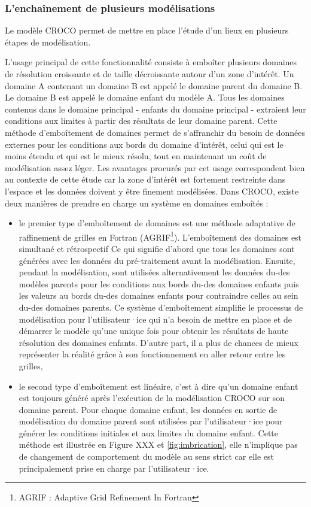 \documentclass[10pt,a4paper,titlepage]{article}
\begin{document}
\subsubsection{L'enchaînement de plusieurs modélisations}
\label{subsub:enchainement_modelisations}
Le modèle CROCO permet de mettre en place l'étude d'un lieux en plusieurs étapes de modélisation.

L'usage principal de cette fonctionnalité consiste à emboîter plusieurs domaines de résolution croissante et de taille décroissante autour d'un zone d'intérêt.
Un domaine A contenant un domaine B est appelé le domaine parent du domaine B.
Le domaine B est appelé le domaine enfant du modèle A.
Tous les domaines contenus dans le domaine principal - enfants du domaine principal - extraient leur conditions aux limites à partir des résultats de leur domaine parent.
Cette méthode d'emboîtement de domaines permet de s'affranchir du besoin de données externes pour les conditions aux bords du domaine d'intérêt, celui qui est le moins étendu et qui est le mieux résolu, tout en maintenant un coût de modélisation assez léger.
Les avantages procurés par cet usage correspondent bien au contexte de cette étude car la zone d'intérêt est fortement restreinte dans l'espace et les données doivent y être finement modélisées.
Dans CROCO, existe deux manières de prendre en charge un système en domaines emboîtés :
\begin{itemize}
    \item le premier type d'emboîtement de domaines est une méthode adaptative de raffinement de grilles en Fortran (AGRIF\footnote{AGRIF : Adaptive Grid Refinement In Fortran}).
    L'emboîtement des domaines est simultané et rétrospectif
    Ce qui signifie d'abord que tous les domaines sont générées avec les données du pré-traitement avant la modélisation.
    Ensuite, pendant la modélisation, sont utilisées alternativement les données du-des modèles parents pour les conditions aux bords du-des domaines enfants puis les valeurs au bords du-des domaines enfants pour contraindre celles au sein du-des domaines parents.
    Ce système d'emboîtement simplifie le processus de modélisation pour l'utilisateur·ice qui n'a besoin de mettre en place et de démarrer le modèle qu'une unique fois pour obtenir les résultats de haute résolution des domaines enfants.
    D'autre part, il a plus de chances de mieux représenter la réalité grâce à son fonctionnement en aller retour entre les grilles,
    \item le second type d'emboîtement est linéaire, c'est à dire qu'un domaine enfant est toujours généré après l'exécution de la modélisation CROCO sur son domaine parent.
    Pour chaque domaine enfant, les données en sortie de modélisation du domaine parent sont utilisées par l'utilisateur·ice pour générer les conditions initiales et aux limites du domaine enfant.
    Cette méthode est illustrée en Figure XXX et \ref{fig:imbrication}, elle n'implique pas de changement de comportement du modèle au sens strict car elle est principalement prise en charge par l'utilisateur·ice.
\end{itemize}
\end{document}
